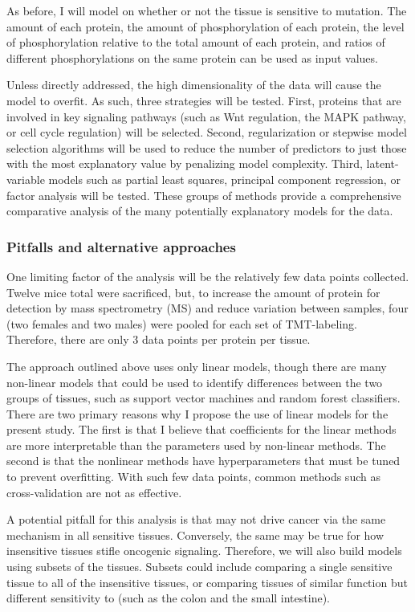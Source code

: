 As before, I will model on whether or not the tissue is sensitive to \KRAS{} mutation. 
The amount of each protein, the amount of phosphorylation of each protein, the level of phosphorylation relative to the total amount of each protein, and ratios of different phosphorylations on the same protein can be used as input values.

Unless directly addressed, the high dimensionality of the data will cause the model to overfit.
As such, three strategies will be tested.
First, proteins that are involved in key signaling pathways (such as Wnt regulation, the MAPK pathway, or cell cycle regulation) will be selected.
Second, regularization or stepwise model selection algorithms will be used to reduce the number of predictors to just those with the most explanatory value by penalizing model complexity.
Third, latent-variable models such as partial least squares, principal component regression, or factor analysis will be tested.
These groups of methods provide a comprehensive comparative analysis of the many potentially explanatory models for the data.

\subsubsection*{Pitfalls and alternative approaches}

One limiting factor of the analysis will be the relatively few data points collected.
Twelve mice total were sacrificed, but, to increase the amount of protein for detection by mass spectrometry (MS) and reduce variation between samples, four (two females and two males) were pooled for each set of TMT-labeling.
Therefore, there are only 3 data points per protein per tissue.

The approach outlined above uses only linear models, though there are many non-linear models that could be used to identify differences between the two groups of tissues, such as support vector machines and random forest classifiers.
There are two primary reasons why I propose the use of linear models for the present study.
The first is that I believe that coefficients for the linear methods are more interpretable than the parameters used by non-linear methods.
The second is that the nonlinear methods have hyperparameters that must be tuned to prevent overfitting.
With such few data points, common methods such as cross-validation are not as effective.

A potential pitfall for this analysis is that \KRAS{} may not drive cancer via the same mechanism in all \KRAS{} sensitive tissues.
Conversely, the same may be true for how insensitive tissues stifle oncogenic \kras{} signaling.
Therefore, we will also build models using subsets of the tissues.
Subsets could include comparing a single sensitive tissue to all of the insensitive tissues, or comparing tissues of similar function but different sensitivity to \KRAS{} (such as the colon and the small intestine).

